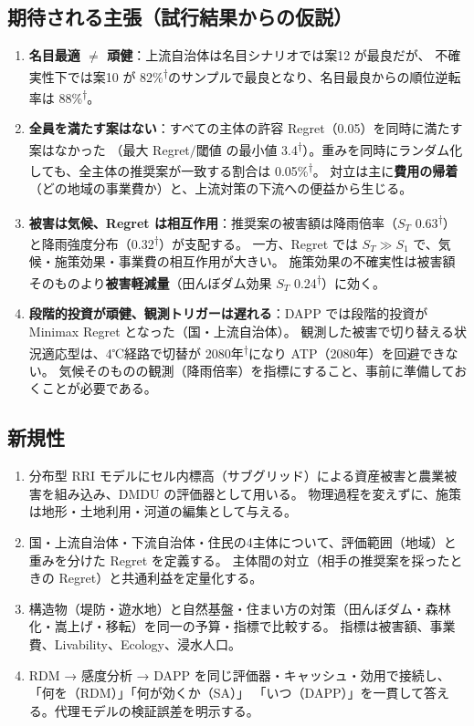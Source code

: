 \documentclass[a4paper,10pt]{ltjsarticle}
\newcommand{\prelim}{\textsuperscript{\textcolor{cgray}{†}}}
\begin{document}
\subsection{期待される主張（試行結果からの仮説）}
\begin{enumerate}
\item \textbf{名目最適 $\neq$ 頑健}：上流自治体は名目シナリオでは案12 が最良だが、
不確実性下では案10 が 82\%\prelim のサンプルで最良となり、名目最良からの順位逆転率は 88\%\prelim。
\item \textbf{全員を満たす案はない}：すべての主体の許容 Regret（0.05）を同時に満たす案はなかった
（最大 Regret$/$閾値 の最小値 3.4\prelim）。重みを同時にランダム化しても、全主体の推奨案が一致する割合は 0.05\%\prelim。
対立は主に\textbf{費用の帰着}（どの地域の事業費か）と、上流対策の下流への便益から生じる。
\item \textbf{被害は気候、Regret は相互作用}：推奨案の被害額は降雨倍率（$S_T$ 0.63\prelim）と降雨強度分布（0.32\prelim）が支配する。
一方、Regret では $S_T \gg S_1$ で、気候・施策効果・事業費の相互作用が大きい。
施策効果の不確実性は被害額そのものより\textbf{被害軽減量}（田んぼダム効果 $S_T$ 0.24\prelim）に効く。
\item \textbf{段階的投資が頑健、観測トリガーは遅れる}：DAPP では段階的投資が Minimax Regret となった（国・上流自治体）。
観測した被害で切り替える状況適応型は、4℃経路で切替が 2080年\prelim になり ATP（2080年）を回避できない。
気候そのものの観測（降雨倍率）を指標にすること、事前に準備しておくことが必要である。
\end{enumerate}

\subsection{新規性}
\begin{enumerate}
\item 分布型 RRI モデルにセル内標高（サブグリッド）による資産被害と農業被害を組み込み、DMDU の評価器として用いる。
物理過程を変えずに、施策は地形・土地利用・河道の編集として与える。
\item 国・上流自治体・下流自治体・住民の4主体について、評価範囲（地域）と重みを分けた Regret を定義する。
主体間の対立（相手の推奨案を採ったときの Regret）と共通利益を定量化する。
\item 構造物（堤防・遊水地）と自然基盤・住まい方の対策（田んぼダム・森林化・嵩上げ・移転）を同一の予算・指標で比較する。
指標は被害額、事業費、Livability、Ecology、浸水人口。
\item RDM → 感度分析 → DAPP を同じ評価器・キャッシュ・効用で接続し、「何を（RDM）」「何が効くか（SA）」
「いつ（DAPP）」を一貫して答える。代理モデルの検証誤差を明示する。
\end{enumerate}
\end{document}
